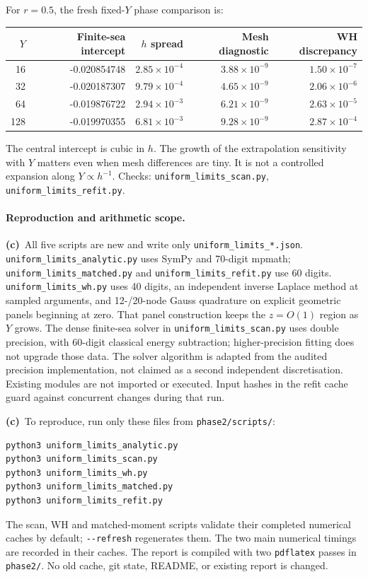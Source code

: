 \documentclass[11pt,a4paper]{article}
\newcommand{\C}{\textbf{(c)}\ }
\newcommand{\scr}[1]{\texttt{uniform\_\allowbreak limits\_\allowbreak #1.py}}
\newcommand{\file}[1]{\nolinkurl{#1}}
\begin{document}
For $r=0.5$, the fresh fixed-$Y$ phase comparison is:
\begin{center}\begin{tabular}{rrrrr}\toprule
$Y$ & Finite-sea intercept & $h$ spread & Mesh diagnostic & WH discrepancy\\\midrule
16 & -0.020854748 & $2.85\times10^{-4}$ & $3.88\times10^{-9}$ & $1.50\times10^{-7}$\\
32 & -0.020187307 & $9.79\times10^{-4}$ & $4.65\times10^{-9}$ & $2.06\times10^{-6}$\\
64 & -0.019876722 & $2.94\times10^{-3}$ & $6.21\times10^{-9}$ & $2.63\times10^{-5}$\\
128 & -0.019970355 & $6.81\times10^{-3}$ & $9.28\times10^{-9}$ & $2.87\times10^{-4}$\\
\bottomrule\end{tabular}\end{center}
The central intercept is cubic in $h$. The growth of the extrapolation
sensitivity with $Y$ matters even when mesh differences are tiny. It is
not a controlled expansion along $Y\propto h^{-1}$. Checks:
\scr{scan}, \scr{refit}.


\paragraph{Reproduction and arithmetic scope.}
\C All five scripts are new and write only \file{uniform_limits_*.json}.
\scr{analytic} uses SymPy and 70-digit mpmath; \scr{matched} and
\scr{refit} use 60 digits. \scr{wh} uses 40 digits, an independent inverse
Laplace method at sampled arguments, and 12-/20-node Gauss quadrature on
explicit geometric panels beginning at zero. That panel construction keeps
the $z=O(1)$ region as $Y$ grows. The dense finite-sea solver in
\scr{scan} uses double precision, with 60-digit classical energy subtraction;
higher-precision fitting does not upgrade those data.
The solver algorithm is adapted from the audited precision implementation,
not claimed as a second independent discretisation. Existing modules are not
imported or executed. Input hashes in the refit cache guard against concurrent
changes during that run.

\C To reproduce, run only these files from \file{phase2/scripts/}:
\begin{verbatim}
python3 uniform_limits_analytic.py
python3 uniform_limits_scan.py
python3 uniform_limits_wh.py
python3 uniform_limits_matched.py
python3 uniform_limits_refit.py
\end{verbatim}
The scan, WH and matched-moment scripts validate their completed numerical caches by default;
\file{--refresh} regenerates them. The two main numerical timings are recorded in their
caches. The report is compiled with two \file{pdflatex} passes in
\file{phase2/}. No old cache, git state, README, or existing report is changed.
\end{document}
